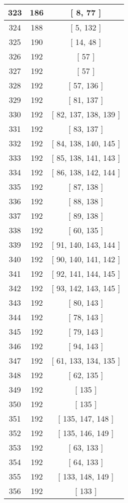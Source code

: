 \begin{center}
\begin{longtable}[H]{|| c c c ||}
\hline
323 & 186 & [ 8, 77 ] \\ 
\hline
324 & 188 & [ 5, 132 ] \\ 
\hline
325 & 190 & [ 14, 48 ] \\ 
\hline
326 & 192 & [ 57 ] \\ 
\hline
327 & 192 & [ 57 ] \\ 
\hline
328 & 192 & [ 57, 136 ] \\ 
\hline
329 & 192 & [ 81, 137 ] \\ 
\hline
330 & 192 & [ 82, 137, 138, 139 ] \\ 
\hline
331 & 192 & [ 83, 137 ] \\ 
\hline
332 & 192 & [ 84, 138, 140, 145 ] \\ 
\hline
333 & 192 & [ 85, 138, 141, 143 ] \\ 
\hline
334 & 192 & [ 86, 138, 142, 144 ] \\ 
\hline
335 & 192 & [ 87, 138 ] \\ 
\hline
336 & 192 & [ 88, 138 ] \\ 
\hline
337 & 192 & [ 89, 138 ] \\ 
\hline
338 & 192 & [ 60, 135 ] \\ 
\hline
339 & 192 & [ 91, 140, 143, 144 ] \\ 
\hline
340 & 192 & [ 90, 140, 141, 142 ] \\ 
\hline
341 & 192 & [ 92, 141, 144, 145 ] \\ 
\hline
342 & 192 & [ 93, 142, 143, 145 ] \\ 
\hline
343 & 192 & [ 80, 143 ] \\ 
\hline
344 & 192 & [ 78, 143 ] \\ 
\hline
345 & 192 & [ 79, 143 ] \\ 
\hline
346 & 192 & [ 94, 143 ] \\ 
\hline
347 & 192 & [ 61, 133, 134, 135 ] \\ 
\hline
348 & 192 & [ 62, 135 ] \\ 
\hline
349 & 192 & [ 135 ] \\ 
\hline
350 & 192 & [ 135 ] \\ 
\hline
351 & 192 & [ 135, 147, 148 ] \\ 
\hline
352 & 192 & [ 135, 146, 149 ] \\ 
\hline
353 & 192 & [ 63, 133 ] \\ 
\hline
354 & 192 & [ 64, 133 ] \\ 
\hline
355 & 192 & [ 133, 148, 149 ] \\ 
\hline
356 & 192 & [ 133 ] \\ 

\end{longtable}
\end{center}
